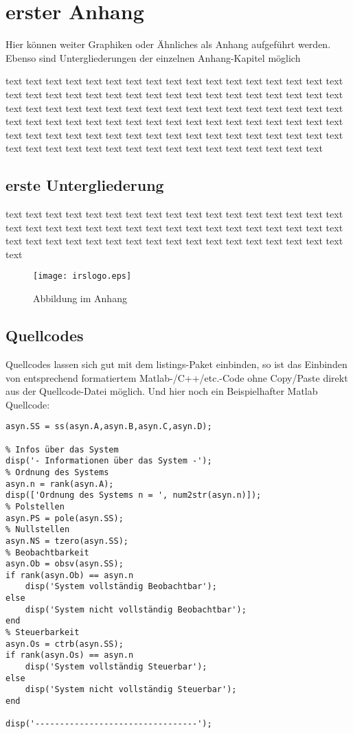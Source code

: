\chapter{erster Anhang} \label{anhang1}

Hier können weiter Graphiken oder Ähnliches als Anhang aufgeführt werden. Ebenso sind Untergliederungen der einzelnen Anhang-Kapitel möglich \cite{sundar_exact_2015}

text text text text text text text text text text text text text text text text text text text text text text text text text text text text text text text text text text text text text text text text text text text text text text text text text text text text text text text text text text text text text text text text text text text text text text text text text text text text text text text text text text text text text text text text text text text text text text text text text text text text text 

\section{erste Untergliederung}

text text text text text text text text text text text text text text text text text text text text text text text text text text text text text text text text text text text text text text text text text text text text text text text text text text text text 

\begin{figure}[!ht]
 \begin{center}
  \texttt{[image: irslogo.eps]}
  \caption{Abbildung im Anhang}\label{bild_anh}
 \end{center}
\end{figure}

\section{Quellcodes}

Quellcodes lassen sich gut mit dem listings-Paket einbinden, so ist das Einbinden von entsprechend formatiertem Matlab-/C++/etc.-Code ohne Copy/Paste direkt aus der Quellcode-Datei möglich. Und hier noch ein Beispielhafter Matlab Quellcode:

\begin{lstlisting}[caption={Ein wahnsinnig komplizierter Quellcode}]
%% State Space System
asyn.SS = ss(asyn.A,asyn.B,asyn.C,asyn.D);

% Infos über das System
disp('- Informationen über das System -');
% Ordnung des Systems
asyn.n = rank(asyn.A);
disp(['Ordnung des Systems n = ', num2str(asyn.n)]);
% Polstellen
asyn.PS = pole(asyn.SS);
% Nullstellen
asyn.NS = tzero(asyn.SS);
% Beobachtbarkeit
asyn.Ob = obsv(asyn.SS);
if rank(asyn.Ob) == asyn.n
    disp('System vollständig Beobachtbar');
else
    disp('System nicht vollständig Beobachtbar');
end
% Steuerbarkeit
asyn.Os = ctrb(asyn.SS);
if rank(asyn.Os) == asyn.n
    disp('System vollständig Steuerbar');
else
    disp('System nicht vollständig Steuerbar');
end

disp('---------------------------------');
\end{lstlisting}